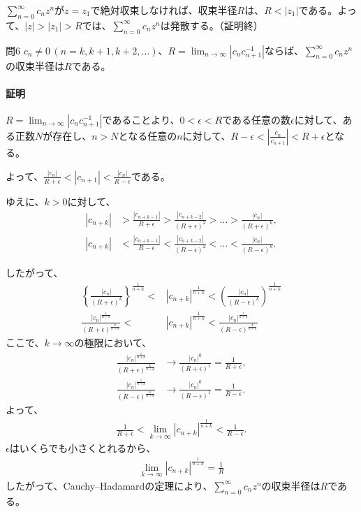$\sum_{n=0}^\infty c_nz^n$が$z=z_1$で絶対収束しなければ、収束半径$R$は、$R<|z_1|$である。よって、$|z|>|z_1|>R$では、$\sum_{n=0}^\infty c_nz^n$は発散する。（証明終）

\begin{mysimplebox}{問6}
    $c_n\neq 0\,(n=k, k+1, k+2,\dots)$、$R=\lim_{n\to\infty}|c_nc_{n+1}^{-1}|$ならば、$\sum_{n=0}^\infty c_nz^n$の収束半径は$R$である。
\end{mysimplebox}
\paragraph{証明}
$R=\lim_{n\to\infty}|c_nc_{n+1}^{-1}|$であることより、$0<\epsilon<R$である任意の数$\epsilon$に対して、ある正数$N$が存在し、$n>N$となる任意の$n$に対して、$R-\epsilon<\left|\frac{c_n}{c_{n+1}}\right|<R+\epsilon$となる。

よって、$\frac{|c_n|}{R+\epsilon}<|c_{n+1}|<\frac{|c_n|}{R-\epsilon}$である。

ゆえに、$k>0$に対して、
\begin{align*}
    |c_{n+k}|&>\frac{|c_{n+k-1}|}{R+\epsilon}>\frac{|c_{n+k-2}|}{(R+\epsilon)^2}>\dots>\frac{|c_{n}|}{(R+\epsilon)^k},\\
    |c_{n+k}|&<\frac{|c_{n+k-1}|}{R-\epsilon}<\frac{|c_{n+k-2}|}{(R-\epsilon)^2}<\dots<\frac{|c_{n}|}{(R-\epsilon)^k}.
\end{align*}

したがって、
\begin{align*}
    \left\{\frac{|c_{n}|}{(R+\epsilon)^k}\right\}^\frac{1}{n+k}<&|c_{n+k}|^\frac{1}{n+k}< \left(\frac{|c_{n}|}{(R-\epsilon)^k}\right)^\frac{1}{n+k}\\
    \frac{|c_{n}|^\frac{1}{n+k}}{(R+\epsilon)^\frac{k}{n+k}}<&|c_{n+k}|^\frac{1}{n+k}< \frac{|c_{n}|^\frac{1}{n+k}}{(R-\epsilon)^\frac{k}{n+k}}
\end{align*}
ここで、$k\longrightarrow\infty$の極限において、
\begin{align*}
    \frac{|c_{n}|^\frac{1}{n+k}}{(R+\epsilon)^\frac{k}{n+k}}&\longrightarrow \frac{|c_{n}|^0}{(R+\epsilon)^1}=\frac{1}{R+\epsilon},\\
    \frac{|c_{n}|^\frac{1}{n+k}}{(R-\epsilon)^\frac{k}{n+k}}&\longrightarrow \frac{|c_{n}|^0}{(R-\epsilon)^1}=\frac{1}{R-\epsilon}.
\end{align*}
よって、
\begin{align*}
    \frac{1}{R+\epsilon}<\lim_{k\to\infty}|c_{n+k}|^\frac{1}{n+k}<\frac{1}{R-\epsilon}.
\end{align*}
$\epsilon$はいくらでも小さくとれるから、
\begin{align*}
    \lim_{k\to\infty}|c_{n+k}|^\frac{1}{n+k}=\frac{1}{R}
\end{align*}
したがって、Cauchy--Hadamardの定理により、$\sum_{n=0}^\infty c_nz^n$の収束半径は$R$である。